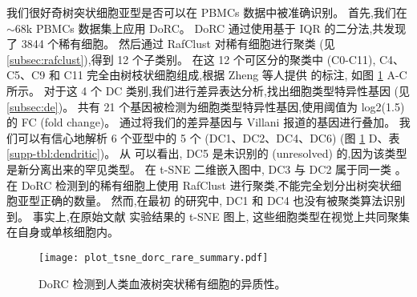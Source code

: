 我们很好奇树突状细胞亚型是否可以在 PBMCs 数据中被准确识别。
首先,我们在 ${\sim}68$k PBMCs 数据集上应用 DoRC。
DoRC 通过使用基于 IQR 的二分法,共发现了 3844 个稀有细胞。
然后通过 RafClust 对稀有细胞进行聚类 (见 \ref{subsec:rafclust}),得到 12 个子类别。
在这 12 个可区分的聚类中 (C0-C11),
C4、C5、C9 和 C11 完全由树枝状细胞组成,根据 Zheng 等人提供 \cite{zheng2017massively}的标注,
如图 \ref{fig:dorc_dendritic} A-C 所示。
对于这 4 个 DC 类别,我们进行差异表达分析,找出细胞类型特异性基因 (见 \ref{subsec:de})。
共有 21 个基因被检测为细胞类型特异性基因,使用阈值为 log2(1.5) 的 FC (fold change)。
通过将我们的差异基因与 Villani \cite{villani2017single} 报道的基因进行叠加。
我们可以有信心地解析 6 个亚型中的 5 个 (DC1、DC2、DC4、DC6) (图 \ref{fig:dorc_dendritic} D、表 \ref{supp-tbl:dendritic})。
从 \cite{villani2017single} 可以看出, DC5 是未识别的 (unresolved) 的,因为该类型是新分离出来的罕见类型。
在 t-SNE 二维嵌入图中, DC3 与 DC2 属于同一类 \cite{maaten2008visualizing}。
在 DoRC 检测到的稀有细胞上使用 RafClust 进行聚类,不能完全划分出树突状细胞亚型正确的数量。
然而,在最初 \cite{zheng2017massively}的研究中, DC1 和 DC4 也没有被聚类算法识别到。
事实上,在原始文献 \cite{zheng2017massively} 实验结果的 t-SNE 图上,
这些细胞类型在视觉上共同聚集在自身或单核细胞内。
\begin{figure}[!htbp]
    \centering
    \texttt{[image: plot\_tsne\_dorc\_rare\_summary.pdf]}
    \caption{
    DoRC 检测到人类血液树突状稀有细胞的异质性。
    }
    \label{fig:dorc_dendritic}
\end{figure}

